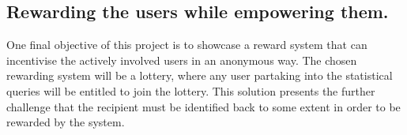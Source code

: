 \subsection{Rewarding the users while empowering them.}

One final objective of this project is to showcase a reward system that can incentivise the actively involved users in an anonymous way. The chosen rewarding system will be a lottery, where any user partaking into the statistical queries will be entitled to join the lottery.  This solution presents the further challenge that the recipient must be identified back to some extent in order to be rewarded by the system.
